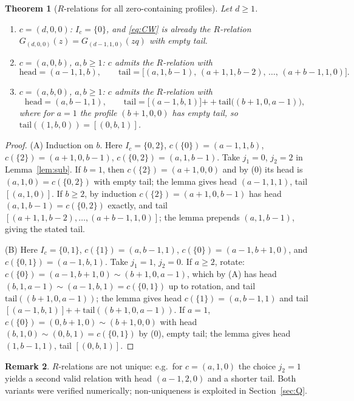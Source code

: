 \documentclass[11pt]{article}
\newtheorem{theorem}{Theorem}
\theoremstyle{definition}
\newtheorem{remark}[theorem]{Remark}
\begin{document}
\begin{theorem}[$R$-relations for all zero-containing profiles]\label{thm:families}
Let $d\ge 1$.
\begin{enumerate}
\item[(0)] $c=(d,0,0)$: $I_c=\{0\}$, and \eqref{eq:CW} is already the $R$-relation
$G_{(d,0,0)}(z)=G_{(d-1,1,0)}(zq)$ with empty tail.
\item[(A)] $c=(a,0,b)$, $a,b\ge 1$: $c$ admits the $R$-relation with
\[
\mathrm{head} = (a{-}1,1,b), \qquad
\mathrm{tail} = \big[(a,1,b{-}1),\,(a{+}1,1,b{-}2),\,\dots,\,(a{+}b{-}1,1,0)\big].
\]
\item[(B)] $c=(a,b,0)$, $a,b\ge 1$: $c$ admits the $R$-relation with
\[
\mathrm{head} = (a,b{-}1,1), \qquad
\mathrm{tail} = \big[(a{-}1,b,1)\big] \mathbin{+\!\!+} \mathrm{tail}\big((b{+}1,0,a{-}1)\big),
\]
where for $a=1$ the profile $(b+1,0,0)$ has empty tail, so
$\mathrm{tail}((1,b,0)) = [(0,b,1)]$.
\end{enumerate}
\end{theorem}

\begin{proof}
(A) Induction on $b$. Here $I_c=\{0,2\}$, $c(\{0\})=(a{-}1,1,b)$,
$c(\{2\})=(a{+}1,0,b{-}1)$, $c(\{0,2\})=(a,1,b{-}1)$. Take $j_1=0$, $j_2=2$ in
Lemma~\ref{lem:sub}. If $b=1$, then $c(\{2\})=(a{+}1,0,0)$ and by (0) its head is
$(a,1,0)=c(\{0,2\})$ with empty tail; the lemma gives head $(a{-}1,1,1)$, tail
$[(a,1,0)]$. If $b\ge 2$, by induction $c(\{2\})=(a{+}1,0,b{-}1)$ has head
$(a,1,b{-}1)=c(\{0,2\})$ exactly, and tail $[(a{+}1,1,b{-}2),\dots,(a{+}b{-}1,1,0)]$;
the lemma prepends $(a,1,b{-}1)$, giving the stated tail.

(B) Here $I_c=\{0,1\}$, $c(\{1\})=(a,b{-}1,1)$, $c(\{0\})=(a{-}1,b{+}1,0)$, and
$c(\{0,1\})=(a{-}1,b,1)$. Take $j_1=1$, $j_2=0$. If $a\ge 2$, rotate:
$c(\{0\})=(a{-}1,b{+}1,0)\sim(b{+}1,0,a{-}1)$, which by (A) has head
$(b,1,a{-}1)\sim(a{-}1,b,1)=c(\{0,1\})$ up to rotation, and tail
$\mathrm{tail}((b{+}1,0,a{-}1))$; the lemma gives head $c(\{1\})=(a,b{-}1,1)$ and tail
$[(a{-}1,b,1)]\mathbin{+\!\!+}\mathrm{tail}((b{+}1,0,a{-}1))$. If $a=1$,
$c(\{0\})=(0,b{+}1,0)\sim(b{+}1,0,0)$ with head $(b,1,0)\sim(0,b,1)=c(\{0,1\})$
by (0), empty tail; the lemma gives head $(1,b{-}1,1)$, tail $[(0,b,1)]$.
\end{proof}

\begin{remark}
$R$-relations are not unique: e.g.\ for $c=(a,1,0)$ the choice $j_2=1$ yields a second
valid relation with head $(a{-}1,2,0)$ and a shorter tail. Both variants were verified
numerically; non-uniqueness is exploited in Section~\ref{sec:Q}.
\end{remark}
\end{document}
